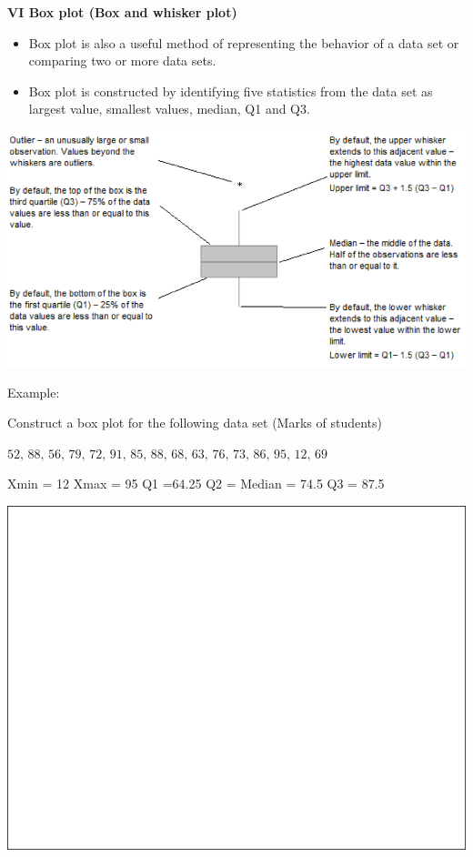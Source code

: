 \documentclass[]{book}
\providecommand{\tightlist}{%
  \setlength{\itemsep}{0pt}\setlength{\parskip}{0pt}}
\begin{document}
\textbf{VI Box plot (Box and whisker plot)}

\begin{itemize}
\tightlist
\item
  Box plot is also a useful method of representing the behavior of a data set or comparing two or more data sets.
\item
  Box plot is constructed by identifying five statistics from the data set as largest value, smallest values, median, Q1 and Q3.
\end{itemize}

\begin{center}\includegraphics[width=1\linewidth]{figure/boxplot} \end{center}

Example:

Construct a box plot for the following data set (Marks of students)

\(\text{52, 88, 56, 79, 72, 91,  85, 88, 68, 63, 76, 73, 86, 95, 12, 69}\)

Xmin = 12 Xmax = 95 Q1 =64.25 Q2 = Median = 74.5 Q3 = 87.5

\begin{center}\includegraphics[width=1\linewidth]{figure/box61-1} \end{center}
\end{document}
